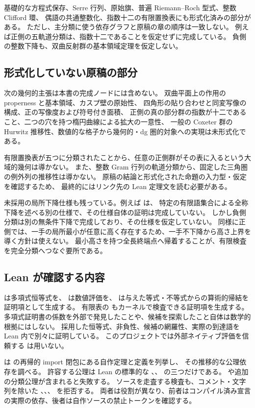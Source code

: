基礎的な方程式保存、Serre 行列、原始旗、普遍 Riemann--Roch 型式、整数 Clifford 環、
偶語の共通整数化、指数十二の有限置換表にも形式化済みの部分がある。
ただし、主分類に使う依存グラフと原稿の章の順序は一致しない。
例えば正側の五軌道分類は、指数十二であることを仮定せずに完成している。
負側の整数下降も、双曲反射群の基本領域定理を仮定しない。

\subsection{形式化していない原稿の部分}
次の幾何的主張は本書の完成ノードには含めない。
双曲平面上の作用の properness と基本領域、カスプ壁の原始性、
四角形の貼り合わせと同変写像の構成、正の写像度および符号付き面積、
正側の真の部分群の指数が十二であること、二つの穴を持つ楕円曲線による拡大の一意性、
一般の Coxeter 群の Hurwitz 推移性、数値的な格子から幾何的・dg 圏的対象への実現は未形式化である。

有限置換表が五つに分類されたことから、任意の正側群がその表に入るという大域的幾何は導かない。
また、整数 Gram 行列の軌道分類から、固定した三角圏の例外列の推移性は導かない。
原稿の結論と形式化された命題の入力型・仮定を確認するため、
最終的にはリンク先の Lean 定理文を読む必要がある。

未採用の局所下降仕様も残っている。例えば  は、
特定の有限語集合による全称下降を述べる別の仕様で、その仕様自体の証明は完成していない。
しかし負側分類は別の無条件下降で完成しており、その仕様を仮定していない。
同様に正側では、一手の局所最小が任意に高く存在するため、一手不下降から高さ上界を導く方針は使えない。
最小高さを持つ全長終端点へ帰着することが、有限検査を完全分類へつなぐ要所である。

\subsection{Lean が確認する内容}
 は多項式恒等式を、 は数値評価を、
 は与えた等式・不等式からの算術的帰結を証明項として生成する。
有限表の  もカーネルで検査できる証明項を生成する。
多項式証明書の係数を外部で発見したことや、候補を探索したこと自体は数学的根拠にはしない。
採用した恒等式、非負性、候補の網羅性、実際の到達語を Lean 内で別々に証明している。
このプロジェクトでは外部ネイティブ評価を信頼する  は用いない。

 は  の再帰的 import 閉包にある自作定理と定義を列挙し、
その推移的な公理依存を調べる。
許容する公理は Lean の標準的な 、、 の三つだけである。
 や追加の分類公理が含まれると失敗する。
ソースを走査する検査も、コメント・文字列を除いた 、、、
 を拒否する。
両者は役割が異なり、前者はコンパイル済み宣言の実際の依存、後者は自作ソースの禁止トークンを確認する。

